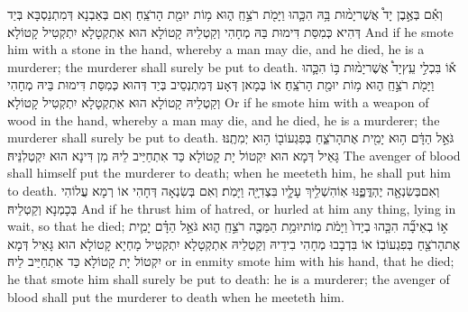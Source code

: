 {וְאִ֡ם בְּאֶ֣בֶן יָד֩ אֲשֶׁר\maqqaf יָמ֨וּת בָּ֥הּ הִכָּ֛הוּ וַיָּמֹ֖ת רֹצֵ֣חַֽ ה֑וּא מ֥וֹת יוּמַ֖ת הָרֹצֵֽחַ׃}
{וְאִם בְּאַבְנָא דְּמִתְנַסְבָּא בְּיַד דְּהִיא כְּמִסַּת דִּימוּת בַּהּ מְחָהִי וְקַטְלֵיהּ קָטוֹלָא הוּא אִתְקְטָלָא יִתְקְטִיל קָטוֹלָא׃}
{And if he smote him with a stone in the hand, whereby a man may die, and he died, he is a murderer; the murderer shall surely be put to death.}{}
{א֡וֹ בִּכְלִ֣י עֵֽץ\maqqaf יָד֩ אֲשֶׁר\maqqaf יָמ֨וּת בּ֥וֹ הִכָּ֛הוּ וַיָּמֹ֖ת רֹצֵ֣חַֽ ה֑וּא מ֥וֹת יוּמַ֖ת הָרֹצֵֽחַ׃}
{אוֹ בְּמָאן דְּאָע דְּמִתְנְסֵיב בְּיַד דְּהוּא כְּמִסַּת דִּימוּת בֵּיהּ מְחָהִי וְקַטְלֵיהּ קָטוֹלָא הוּא אִתְקְטָלָא יִתְקְטִיל קָטוֹלָא׃}
{Or if he smote him with a weapon of wood in the hand, whereby a man may die, and he died, he is a murderer; the murderer shall surely be put to death.}{}
{גֹּאֵ֣ל הַדָּ֔ם ה֥וּא יָמִ֖ית אֶת\maqqaf הָרֹצֵ֑חַ בְּפִגְעוֹ\maqqaf ב֖וֹ ה֥וּא יְמִתֶֽנּוּ׃}
{גָּאֵיל דְּמָא הוּא יִקְטוֹל יָת קָטוֹלָא כַּד אִתְחַיַּיב לֵיהּ מִן דִּינָא הוּא יִקְטְלִנֵּיהּ׃}
{The avenger of blood shall himself put the murderer to death; when he meeteth him, he shall put him to death.}{}
{וְאִם\maqqaf בְּשִׂנְאָ֖ה יֶהְדֳּפֶ֑נּוּ אֽוֹ\maqqaf הִשְׁלִ֥יךְ עָלָ֛יו בִּצְדִיָּ֖ה וַיָּמֹֽת׃}
{וְאִם בְּשִׂנְאָה דְּחָהִי אוֹ רְמָא עֲלוֹהִי בְּכָמְנָא וְקַטְלֵיהּ׃}
{And if he thrust him of hatred, or hurled at him any thing, lying in wait, so that he died;}{}
{א֣וֹ בְאֵיבָ֞ה הִכָּ֤הוּ בְיָדוֹ֙ וַיָּמֹ֔ת מֽוֹת\maqqaf יוּמַ֥ת הַמַּכֶּ֖ה רֹצֵ֣חַֽ ה֑וּא גֹּאֵ֣ל הַדָּ֗ם יָמִ֛ית אֶת\maqqaf הָרֹצֵ֖חַ בְּפִגְעוֹ\maqqaf בֽוֹ׃}
{אוֹ בִּדְבָבוּ מְחָהִי בִידֵיהּ וְקַטְלֵיהּ אִתְקְטָלָא יִתְקְטִיל מָחְיָא קָטוֹלָא הוּא גָּאֵיל דְּמָא יִקְטוֹל יָת קָטוֹלָא כַּד אִתְחַיַּיב לֵיהּ׃}
{or in enmity smote him with his hand, that he died; he that smote him shall surely be put to death: he is a murderer; the avenger of blood shall put the murderer to death when he meeteth him.}{}
